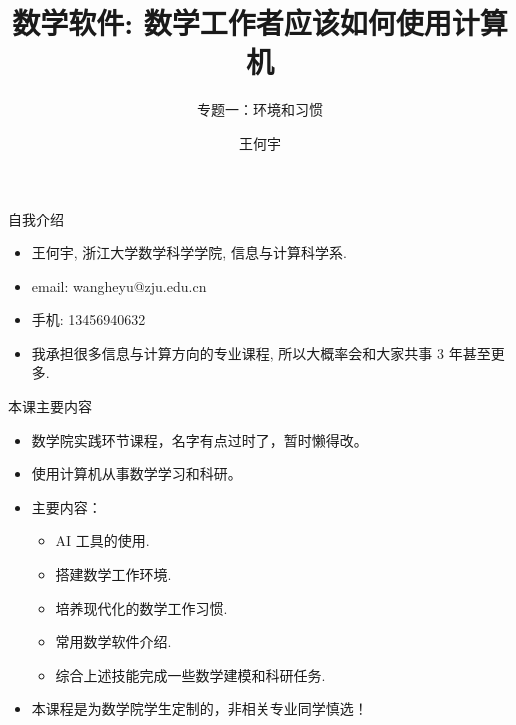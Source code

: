 \documentclass{beamer}
\title[Beamer + xelatex] %
{\Huge 数学软件: 数学工作者应该如何使用计算机}
\subtitle
{专题一：环境和习惯} %
\author[Wang HY] %
{王何宇}
\institute[ZJU] %
{
  浙江大学数学科学学院\\
  信息与计算科学系
}
\date[] %
{}
\begin{document}
\begin{frame}
 \titlepage
\end{frame}


\begin{frame}{自我介绍}
  \begin{itemize}
  \item 王何宇, 浙江大学数学科学学院, 信息与计算科学系.
  \item email: wangheyu@zju.edu.cn
  \item 手机: 13456940632
  \item 我承担很多信息与计算方向的专业课程, 所以大概率会和大家共事 3 年甚至更多.
  \end{itemize}
\end{frame}

\begin{frame}{本课主要内容}
  \begin{itemize}
  \item<1-> 数学院实践环节课程，名字有点过时了，暂时懒得改。
  \item<2-> 使用计算机从事数学学习和科研。
  \item<3-> 主要内容：
    \begin{itemize}
    \item<3-> AI 工具的使用.
    \item<3-> 搭建数学工作环境.
    \item<3-> 培养现代化的数学工作习惯.
    \item<3-> 常用数学软件介绍.
    \item<3-> 综合上述技能完成一些数学建模和科研任务.
    \end{itemize}
  \item<4-> 本课程是为数学院学生定制的，非相关专业同学慎选！
  \end{itemize}
\end{frame}

\end{document}
